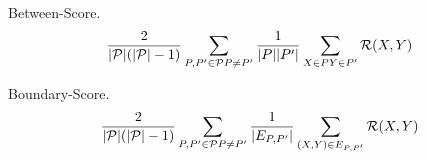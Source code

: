 \begin{definition} \label{between-score}
Between-Score.
\[ \frac{2}{|\mathcal{P}|(|\mathcal{P}| - 1)}
     \sum_{P, P' \in \mathcal{P} \\ P \neq P'}
   \frac{1}{|P| |P'|} \sum_{X \in P \\ Y \in P'} \mathcal{R}(X,Y)
\]
\end{definition}

\begin{definition} \label{boundary-score}
Boundary-Score.
\[ \frac{2}{|\mathcal{P}|(|\mathcal{P}| - 1)}
     \sum_{P, P' \in \mathcal{P} \\ P \neq P'}
   \frac{1}{|E_{P,P'}|} \sum_{(X,Y) \in E_{P,P'}} \mathcal{R}(X,Y)
\]
\end{definition}
